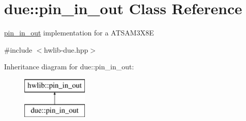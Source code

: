 \hypertarget{classdue_1_1pin__in__out}{}\section{due\+:\+:pin\+\_\+in\+\_\+out Class Reference}
\label{classdue_1_1pin__in__out}


\hyperlink{classdue_1_1pin__in__out}{pin\+\_\+in\+\_\+out} implementation for a A\+T\+S\+A\+M3\+X8E  




{\ttfamily \#include $<$hwlib-\/due.\+hpp$>$}

Inheritance diagram for due\+:\+:pin\+\_\+in\+\_\+out\+:\begin{figure}[H]
\begin{center}
\leavevmode
\includegraphics[height=2.000000cm]{classdue_1_1pin__in__out}
\end{center}
\end{figure}

